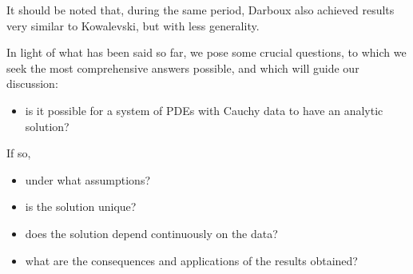 It should be noted that, during the same period, Darboux also achieved results very similar to Kowalevski, but with less generality.

\newpage

In light of what has been said so far, we pose some crucial questions, to which we seek the most comprehensive answers possible, and which will guide our discussion:
\begin{itemize}
\item is it possible for a system of PDEs with Cauchy data to have an analytic solution?
\end{itemize}
If so,
\begin{itemize}
\item under what assumptions?
\item is the solution unique?
\item does the solution depend continuously on the data?
\item what are the consequences and applications of the results obtained?
\end{itemize}

